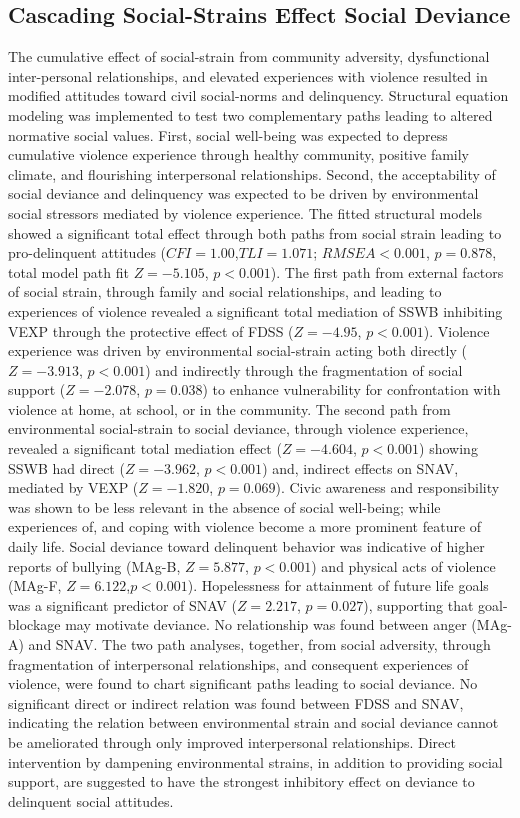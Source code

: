 \documentclass[utf8]{frontiersSCNS} %
\begin{document}
\subsection{Cascading Social-Strains Effect Social Deviance}
The cumulative effect of social-strain from community adversity, dysfunctional inter-personal relationships, and elevated experiences with violence resulted in modified attitudes toward civil social-norms and delinquency. Structural equation modeling was implemented to test two complementary paths leading to altered normative social values. First, social well-being was expected to depress cumulative violence experience through healthy community, positive family climate, and flourishing interpersonal relationships. Second, the acceptability of social deviance and delinquency was expected to be driven by environmental social stressors mediated by violence experience. The fitted structural models showed a significant total effect through both paths from social strain leading to pro-delinquent attitudes ($CFI=1.00$,$TLI=1.071$; $RMSEA<0.001$, $p=0.878$, total model path fit $Z=-5.105$, $p<0.001$). The first path from external factors of social strain, through family and social relationships, and leading to experiences of violence revealed a significant total mediation of SSWB inhibiting VEXP through the protective effect of FDSS ($Z=-4.95$, $p<0.001$). Violence experience was driven by environmental social-strain acting both directly ($Z=-3.913$, $p<0.001$) and indirectly through the fragmentation of social support ($Z=-2.078$, $p=0.038$) to enhance vulnerability for confrontation with violence at home, at school, or in the community. The second path from environmental social-strain to social deviance, through violence experience, revealed a significant total mediation effect  ($Z=-4.604$, $p<0.001$) showing SSWB had direct ($Z=-3.962$, $p<0.001$) and, indirect effects on SNAV, mediated by VEXP ($Z=-1.820$, $p=0.069$). Civic awareness and responsibility was shown to be less relevant in the absence of social well-being; while experiences of, and coping with violence become a more prominent feature of daily life. Social deviance toward delinquent behavior was indicative of higher reports of bullying (MAg-B, $Z=5.877$, $p<0.001$) and physical acts of violence (MAg-F, $Z=6.122$,$p<0.001$). Hopelessness for attainment of future life goals was a significant predictor of SNAV ($Z=2.217$, $p=0.027$), supporting that goal-blockage may motivate deviance. No relationship was found between anger (MAg-A) and SNAV. The two path analyses, together, from social adversity, through fragmentation of interpersonal relationships, and consequent experiences of violence, were found to chart significant paths leading to social deviance. No significant direct or indirect relation was found between FDSS and SNAV, indicating the relation between environmental strain and social deviance cannot be ameliorated through only improved interpersonal relationships. Direct intervention by dampening environmental strains, in addition to providing social support, are suggested to have the strongest inhibitory effect on deviance to delinquent social attitudes. 
\end{document}
